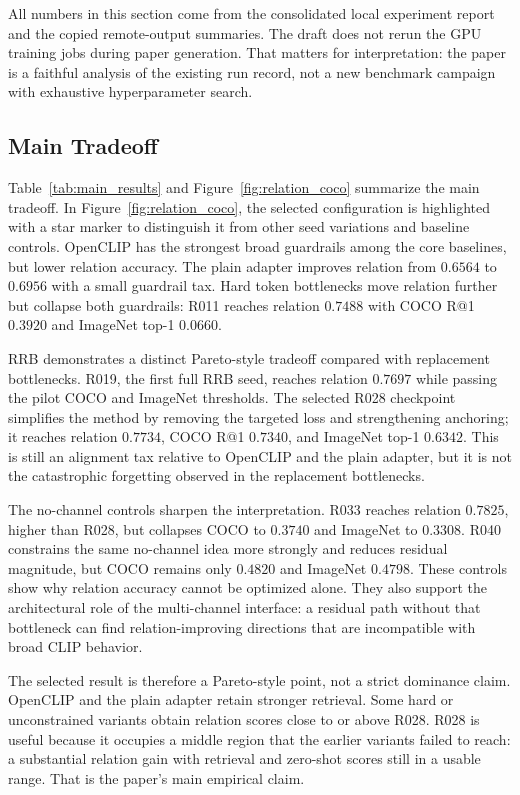 All numbers in this section come from the consolidated local experiment report and the copied remote-output summaries. The draft does not rerun the GPU training jobs during paper generation. That matters for interpretation: the paper is a faithful analysis of the existing run record, not a new benchmark campaign with exhaustive hyperparameter search.



\subsection{Main Tradeoff}

Table~\ref{tab:main_results} and Figure~\ref{fig:relation_coco} summarize the main tradeoff. In Figure~\ref{fig:relation_coco}, the selected configuration is highlighted with a star marker to distinguish it from other seed variations and baseline controls. OpenCLIP has the strongest broad guardrails among the core baselines, but lower relation accuracy. The plain adapter improves relation from $0.6564$ to $0.6956$ with a small guardrail tax. Hard token bottlenecks move relation further but collapse both guardrails: R011 reaches relation $0.7488$ with COCO R@1 $0.3920$ and ImageNet top-1 $0.0660$.

RRB demonstrates a distinct Pareto-style tradeoff compared with replacement bottlenecks. R019, the first full RRB seed, reaches relation $0.7697$ while passing the pilot COCO and ImageNet thresholds. The selected R028 checkpoint simplifies the method by removing the targeted loss and strengthening anchoring; it reaches relation $0.7734$, COCO R@1 $0.7340$, and ImageNet top-1 $0.6342$. This is still an alignment tax relative to OpenCLIP and the plain adapter, but it is not the catastrophic forgetting observed in the replacement bottlenecks.

The no-channel controls sharpen the interpretation. R033 reaches relation $0.7825$, higher than R028, but collapses COCO to $0.3740$ and ImageNet to $0.3308$. R040 constrains the same no-channel idea more strongly and reduces residual magnitude, but COCO remains only $0.4820$ and ImageNet $0.4798$. These controls show why relation accuracy cannot be optimized alone. They also support the architectural role of the multi-channel interface: a residual path without that bottleneck can find relation-improving directions that are incompatible with broad CLIP behavior.

The selected result is therefore a Pareto-style point, not a strict dominance claim. OpenCLIP and the plain adapter retain stronger retrieval. Some hard or unconstrained variants obtain relation scores close to or above R028. R028 is useful because it occupies a middle region that the earlier variants failed to reach: a substantial relation gain with retrieval and zero-shot scores still in a usable range. That is the paper's main empirical claim.

